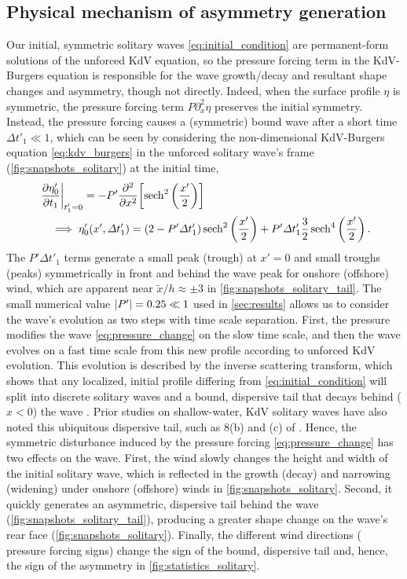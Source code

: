 \documentclass{jfm}
\begin{document}
\subsection{\label{sec:physical_reason} Physical mechanism of asymmetry
generation}
Our initial, symmetric solitary waves \cref{eq:initial_condition} are
permanent-form solutions of the unforced KdV equation, so the pressure
forcing term in the KdV-Burgers equation is responsible for the wave
growth/decay and resultant shape changes and asymmetry, though not
directly.
Indeed, when the surface profile $\eta$ is symmetric, the pressure
forcing term $P \partial_x^2 \eta$ preserves the initial symmetry.
Instead, the pressure forcing causes a (symmetric) bound wave after a
short time $\Delta t'_1 \ll 1$, which can be seen by considering the
non-dimensional KdV-Burgers equation \cref{eq:kdv_burgers} in the
unforced solitary wave's frame (\cref{fig:snapshots_solitary}) at the
initial time,
\begin{align}
  &\eval{\pdv{\eta'_0}{t_1}}_{t'_1=0} = -P' \pdv[2]{x} \bqty{
  \sech^2\pqty{\frac{x'}{2}}}
  \\
  &\quad \implies \eta'_0(x', \Delta t'_1) =
  (2-P'\Delta t'_1) \sech^2\pqty{\frac{x'}{2}}
  +
  P' \Delta t'_1 \frac{3}{2}\sech^4\pqty{\frac{x'}{2}}
  \,.
  \label{eq:pressure_change}
\end{align}
The $P'\Delta t'_1$ terms generate a small peak (trough) at $x'=0$ and
small troughs (peaks) symmetrically in front and behind the wave peak
for onshore (offshore) wind, which are apparent near $\tilde{x}/h
\approx \pm 3$ in \cref{fig:snapshots_solitary_tail}.
The small numerical value $\abs{P'} = 0.25 \ll 1$ used in
\cref{sec:results} allows us to consider the wave's evolution as two
steps with time scale separation.
First, the pressure modifies the wave \cref{eq:pressure_change} on the
slow time scale, and then the wave evolves on a fast time scale from
this new profile according to unforced KdV evolution.
This evolution is described by the inverse scattering transform, which
shows that any localized, initial profile differing from
\cref{eq:initial_condition} will split into discrete solitary waves and
a bound, dispersive tail that decays behind ($x<0$) the wave
\citep[\eg][]{mei2005nonlinear}.
Prior studies on shallow-water, KdV solitary waves have also noted this
ubiquitous dispersive tail, such as \figsname{} 8(b) and (c) of
\citet{hammack1974korteweg}.
Hence, the symmetric disturbance induced by the pressure forcing
\cref{eq:pressure_change} has two effects on the wave.
First, the wind slowly changes the height and width of the initial
solitary wave, which is reflected in the growth (decay) and narrowing
(widening) under onshore (offshore) winds in
\cref{fig:snapshots_solitary}.
Second, it quickly generates an asymmetric, dispersive tail behind the
wave (\cref{fig:snapshots_solitary_tail}), producing a greater shape
change on the wave's rear face (\cref{fig:snapshots_solitary}).
Finally, the different wind directions (\ie{} pressure forcing signs)
change the sign of the bound, dispersive tail and, hence, the sign of
the asymmetry in \cref{fig:statistics_solitary}.
\end{document}
